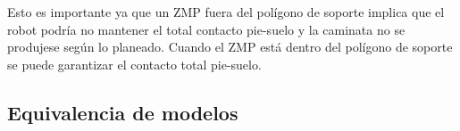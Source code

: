 Esto es importante ya que un ZMP fuera del polígono de soporte implica que el robot podría no mantener el total contacto pie-suelo y la caminata no se produjese según lo planeado. Cuando el ZMP está dentro del polígono de soporte se puede garantizar el contacto total pie-suelo.

\newpage

\subsection{Equivalencia de modelos}

